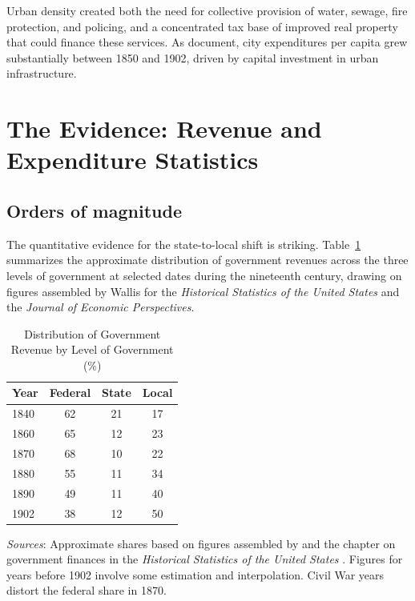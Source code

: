 \documentclass[12pt]{article}
\begin{document}
Urban density created both the need for collective provision of water, sewage, fire protection, and policing, and a concentrated tax base of improved real property that could finance these services.  As \citet{legler_sylla_wallis1988} document, city expenditures per capita grew substantially between 1850 and 1902, driven by capital investment in urban infrastructure.


\section{The Evidence: Revenue and Expenditure Statistics}

\subsection{Orders of magnitude}

The quantitative evidence for the state-to-local shift is striking.  Table~\ref{tab:rev_comparison} summarizes the approximate distribution of government revenues across the three levels of government at selected dates during the nineteenth century, drawing on figures assembled by Wallis for the \textit{Historical Statistics of the United States} and the \textit{Journal of Economic Perspectives}.

\begin{table}[htbp]
\centering
\caption{Distribution of Government Revenue by Level of Government (\%)}
\label{tab:rev_comparison}
\begin{tabular}{@{}lccc@{}}
\toprule
Year & Federal & State & Local \\
\midrule
1840 & 62 & 21 & 17 \\
1860 & 65 & 12 & 23 \\
1870 & 68 & 10 & 22 \\
1880 & 55 & 11 & 34 \\
1890 & 49 & 11 & 40 \\
1902 & 38 & 12 & 50 \\
\bottomrule
\end{tabular}
\smallskip

\small\textit{Sources}: Approximate shares based on figures assembled by \citet{wallis2000jep} and the chapter on government finances in the \textit{Historical Statistics of the United States} \citep{wallis2006hsus}.  Figures for years before 1902 involve some estimation and interpolation.  Civil War years distort the federal share in 1870.
\end{table}
\end{document}
